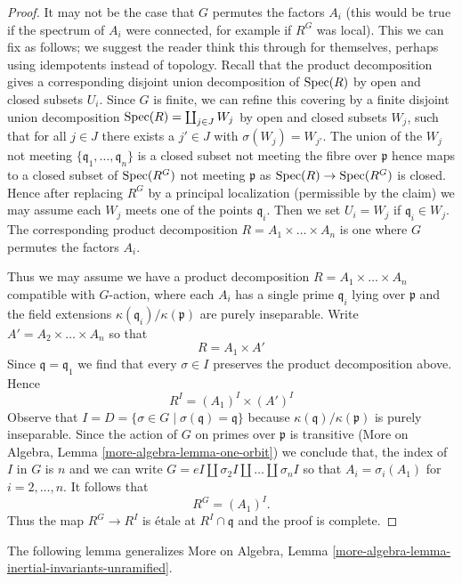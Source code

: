 \begin{proof}
\medskip\noindent
It may not be the case that $G$ permutes the factors $A_i$
(this would be true if the spectrum of $A_i$ were connected,
for example if $R^G$ was local). This we can fix as follows;
we suggest the reader think this through for themselves, perhaps
using idempotents instead of topology.
Recall that the product decomposition gives a corresponding
disjoint union decomposition of $\mathop{\mathrm{Spec}}(R)$ by open and closed
subsets $U_i$. Since $G$ is finite, we can refine this covering
by a finite disjoint union decomposition
$\mathop{\mathrm{Spec}}(R) = \coprod_{j \in J} W_j$ by open
and closed subsets $W_j$, such that for all $j \in J$ there exists
a $j' \in J$ with $\sigma(W_j) = W_{j'}$. The union of the
$W_j$ not meeting $\{\mathfrak q_1, \ldots, \mathfrak q_n\}$
is a closed subset not meeting the fibre over $\mathfrak p$
hence maps to a closed subset of $\mathop{\mathrm{Spec}}(R^G)$ not meeting
$\mathfrak p$ as $\mathop{\mathrm{Spec}}(R) \to \mathop{\mathrm{Spec}}(R^G)$ is closed.
Hence after replacing $R^G$ by a principal localization
(permissible by the claim) we may assume each $W_j$ meets
one of the points $\mathfrak q_i$. Then we set $U_i = W_j$
if $\mathfrak q_i \in W_j$. The corresponding product decomposition
$R = A_1 \times \ldots \times A_n$ is one
where $G$ permutes the factors $A_i$.

\medskip\noindent
Thus we may assume we have a product decomposition
$R = A_1 \times \ldots \times A_n$ compatible with $G$-action,
where each $A_i$ has a single prime $\mathfrak q_i$ lying
over $\mathfrak p$ and the field extensions
$\kappa(\mathfrak q_i)/\kappa(\mathfrak p)$ are purely inseparable.
Write $A' = A_2 \times \ldots \times A_n$ so that
$$
R = A_1 \times A'
$$
Since $\mathfrak q = \mathfrak q_1$ we find that every
$\sigma \in I$ preserves the product decomposition above.
Hence
$$
R^I = (A_1)^I \times (A')^I
$$
Observe that $I = D = \{\sigma \in G \mid \sigma(\mathfrak q) = \mathfrak q\}$
because $\kappa(\mathfrak q)/\kappa(\mathfrak p)$ is purely inseparable.
Since the action of $G$ on primes over $\mathfrak p$ is transitive
(More on Algebra, Lemma \ref{more-algebra-lemma-one-orbit})
we conclude that, the index of $I$ in $G$ is $n$ and we can write
$G = eI \amalg \sigma_2I \amalg \ldots \amalg \sigma_nI$ so that
$A_i = \sigma_i(A_1)$ for $i = 2, \ldots, n$. It follows that
$$
R^G = (A_1)^I.
$$
Thus the map $R^G \to R^I$ is \'etale at $R^I \cap \mathfrak q$
and the proof is complete.
\end{proof}

\noindent
The following lemma generalizes
More on Algebra, Lemma \ref{more-algebra-lemma-inertial-invariants-unramified}.

